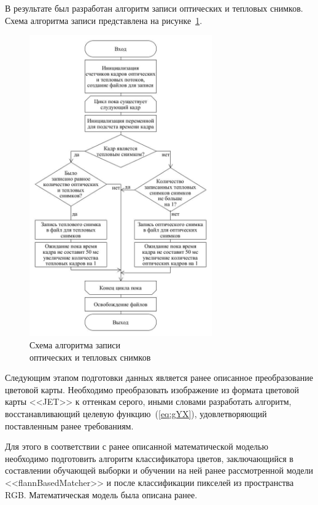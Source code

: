 \documentclass[14pt, a4paper]{extreport}
\begin{document}
	В результате был разработан алгоритм записи оптических и тепловых снимков. Схема алгоритма записи представлена на рисунке~\ref{fig:loaddata}.
	
	\begin{figure}[h!]
		\centering
		\includegraphics[width = 0.7\textwidth]{image/chapter_2/loaddata}	
		\caption{Схема алгоритма записи\\ оптических и тепловых снимков}
		\label{fig:loaddata}
	\end{figure}
	
	Следующим этапом подготовки данных является ранее описанное преобразование цветовой карты. Необходимо преобразовать изображение из формата цветовой карты <<JET>> к оттенкам серого, иными словами разработать алгоритм, восстанавливающий целевую функцию~(\ref{eq:gYX}), удовлетворяющий поставленным ранее требованиям.
	
	Для этого в соответствии с ранее описанной математической моделью необходимо подготовить алгоритм классификатора цветов, заключающийся в составлении обучающей выборки и обучении на ней ранее рассмотренной модели <<flannBasedMatcher>> и после классификации пикселей из пространства RGB. Математическая модель была описана ранее.  
	
\end{document}
